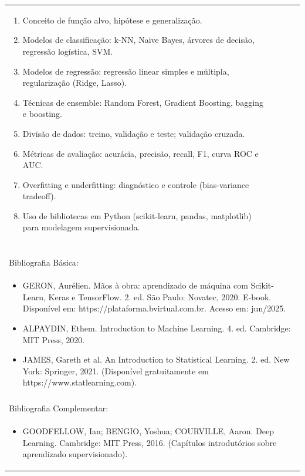 \documentclass[11pt]{article}
\begin{document}
\begin{center}
\begin{longtable}{|p{4cm}|p{4cm}|p{4cm}|p{4cm}|}
{\begin{enumerate}
\item Conceito de função alvo, hipótese e generalização.
\item Modelos de classificação: k-NN, Naive Bayes, árvores de decisão, regressão logística, SVM.
\item Modelos de regressão: regressão linear simples e múltipla, regularização (Ridge, Lasso).
\item Técnicas de ensemble: Random Forest, Gradient Boosting, bagging e boosting.
\item Divisão de dados: treino, validação e teste; validação cruzada.
\item Métricas de avaliação: acurácia, precisão, recall, F1, curva ROC e AUC.
\item Overfitting e underfitting: diagnóstico e controle (bias-variance tradeoff).
\item Uso de bibliotecas em Python (scikit-learn, pandas, matplotlib) para modelagem supervisionada.\end{enumerate}}\\
\multicolumn{4}{|p{16cm}|}{}\\
\multicolumn{4}{|p{16cm}|}{}\\
\multicolumn{4}{|p{16cm}|}{\vspace{-1cm}}\\
\multicolumn{4}{|p{16cm}|}{}\\
\hline
\multicolumn{4}{|p{16cm}|}{Bibliografia Básica:}\\
\multicolumn{4}{|p{16cm}|}{%
\begin{itemize}\item GERON, Aurélien. Mãos à obra: aprendizado de máquina com Scikit-Learn, Keras e TensorFlow. 2. ed. São Paulo: Novatec, 2020. E-book. Disponível em: https://plataforma.bvirtual.com.br. Acesso em: jun/2025.
\item ALPAYDIN, Ethem. Introduction to Machine Learning. 4. ed. Cambridge: MIT Press, 2020.
\item JAMES, Gareth et al. An Introduction to Statistical Learning. 2. ed. New York: Springer, 2021. (Disponível gratuitamente em https://www.statlearning.com).\end{itemize}}\\
\multicolumn{4}{|p{16cm}|}{}\\
\hline
\multicolumn{4}{|p{16cm}|}{Bibliografia Complementar:}\\
\multicolumn{4}{|p{16cm}|}{%
\begin{itemize}\item GOODFELLOW, Ian; BENGIO, Yoshua; COURVILLE, Aaron. Deep Learning. Cambridge: MIT Press, 2016. (Capítulos introdutórios sobre aprendizado supervisionado).

\end{itemize}}
\end{longtable}
\end{center}
\end{document}
